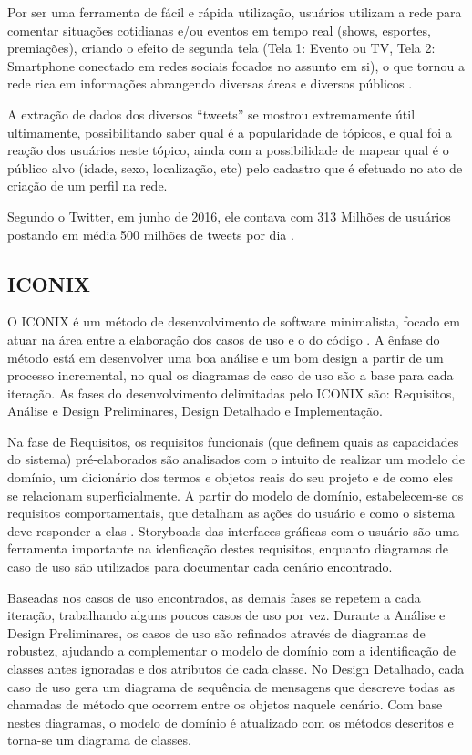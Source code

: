 \documentclass[
	12pt,				%
	openright,			%
	oneside,			%
	a4paper,			%
	english,			%
	spanish,			%
	brazil				%
	]{abntex2}
\begin{document}
	Por ser uma ferramenta de fácil e rápida utilização, usuários utilizam a rede para comentar situações cotidianas e/ou eventos em tempo real (shows, esportes, premiações), criando o efeito de segunda tela (Tela 1: Evento ou TV, Tela 2: Smartphone conectado em redes sociais focados no assunto em si), o que tornou a rede rica em informações abrangendo diversas áreas e diversos públicos \cite{conference_twitter_sports}.

	A extração de dados dos diversos ``tweets'' se mostrou extremamente útil ultimamente, possibilitando saber qual é a popularidade de tópicos, e qual foi a reação dos usuários neste tópico,  ainda com a possibilidade de mapear qual é o público alvo (idade, sexo, localização, etc) pelo cadastro que é efetuado no ato de criação de um perfil na rede.

	Segundo o Twitter, em junho de 2016, ele contava com 313 Milhões de usuários \cite{twitter_company} postando em média 500 milhões de tweets por dia \cite{TwitterU87:online}.
	
	\subsection{ICONIX}	
	
	O ICONIX é um método de desenvolvimento de software minimalista, focado em atuar na área entre a elaboração dos casos de uso e o do código \cite{iconix}. A ênfase do método está em desenvolver uma boa análise e um bom design a partir de um processo incremental, no qual os diagramas de caso de uso são a base para cada iteração. As fases do desenvolvimento delimitadas pelo ICONIX são: Requisitos, Análise e Design Preliminares, Design Detalhado e Implementação.
	
	Na fase de Requisitos, os requisitos funcionais (que definem quais as capacidades do sistema) pré-elaborados são analisados com o intuito de realizar um modelo de domínio, um dicionário dos termos e objetos reais do seu projeto e de como eles se relacionam superficialmente. A partir do modelo de domínio, estabelecem-se os requisitos comportamentais, que detalham as ações do usuário e como o sistema deve responder a elas \cite{iconix}. Storyboads das interfaces gráficas com o usuário são uma ferramenta importante na idenficação destes requisitos, enquanto diagramas de caso de uso são utilizados para documentar cada cenário encontrado.
	
	Baseadas nos casos de uso encontrados, as demais fases se repetem a cada iteração, trabalhando alguns poucos casos de uso por vez. Durante a Análise e Design Preliminares, os casos de uso são refinados através de diagramas de robustez, ajudando a complementar o modelo de domínio com a identificação de classes antes ignoradas e dos atributos de cada classe. No Design Detalhado, cada caso de uso gera um diagrama de sequência de mensagens que descreve todas as chamadas de método que ocorrem entre os objetos naquele cenário. Com base nestes diagramas, o modelo de domínio é atualizado com os métodos descritos e torna-se um diagrama de classes.
	
\end{document}
